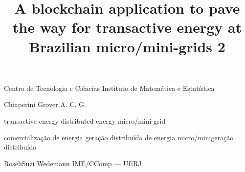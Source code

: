 
            {Centro de Tecnologia e Ciências}
            {Instituto de Matemática e Estatística}
            {}

      {Chiaperini Grover}
      {A. C. G.}

\title{A blockchain application to pave the way for transactive energy at Brazilian micro/mini-grids 2}
         {transactive energy}
         {distributed energy}
         {micro/mini-grid}

               {comercialização de energia}
               {geração distribuída de energia}
               {micro/minigeração distribuída}

           {Roseli}{Suzi Wedemann} 
           {IME/CComp --- UERJ} 




